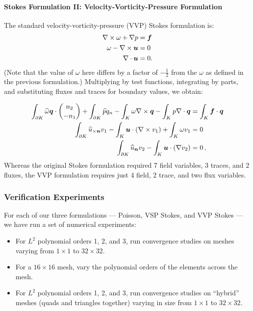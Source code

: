 \paragraph{Stokes Formulation II: Velocity-Vorticity-Pressure Formulation}  The standard velocity-vorticity-pressure (VVP) Stokes formulation is:
\begin{align*}
\NVRcurl \omega + \NVRgrad p &= \vect{f}\\
\omega - \NVRcurl \vect{u} &= 0\\
\NVRdiv \vect{u} &= 0.
\end{align*}
(Note that the value of $\omega$ here differs by a factor of $-\frac{1}{2}$ from the $\omega$ as defined in the previous formulation.)  Multiplying by test functions, integrating by parts, and substituting fluxes and traces for boundary values, we obtain:

\begin{align*}
\int_{\partial K} \widehat{\omega} \vect{q} \cdot {n_{2} \choose -n_{1}} + \int_{\partial K} \widehat{p} q_{n} -  \int_{K}\omega \NVRcurl \vect{q} -  \int_{K} p \NVRdiv \vect{q} &= \int_{K} \vect{f} \cdot \vect{q}\\
\int_{\partial K} \widehat{u}_{\times \vect{n}}v_{1} -  \int_{K}\vect{u} \cdot (\NVRcurl v_{1}) +  \int_{K} \omega v_{1} &= 0\\
\int_{\partial K} \widehat{u}_{\vect{n}} v_{2} -  \int_{K}\vect{u} \cdot (\NVRgrad v_{2}) &= 0 \,.
\end{align*}
Whereas the original Stokes formulation required 7 field variables, 3 traces, and 2 fluxes, the VVP formulation requires just 4 field, 2 trace, and two flux variables.

\subsubsection{Verification Experiments}\label{NVR:sec:numericalResults}
For each of our three formulations --- Poisson, VSP Stokes, and VVP Stokes --- we have run a set of numerical experiments:
\begin{itemize}
\item For $L^{2}$ polynomial orders 1, 2, and 3, run convergence studies on meshes varying from $1 \times 1$ to $32 \times 32$.
\item For a $16 \times 16$ mesh, vary the polynomial orders of the elements across the mesh.
\item For $L^{2}$ polynomial orders 1, 2, and 3, run convergence studies on ``hybrid'' meshes (quads and triangles together) varying in size from $1 \times 1$ to $32 \times 32$.
\end{itemize}

